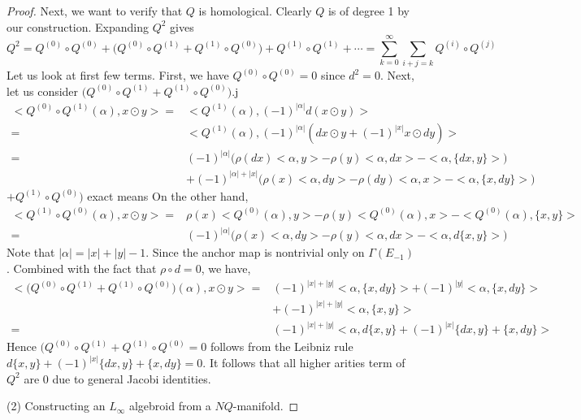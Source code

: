 \documentclass[12pt]{amsart}
\theoremstyle{definition}
\theoremstyle{remark}
\numberwithin{equation}{section}
\newcommand{\1}{{\mathbb{1}}}
\begin{document}
\begin{proof}
Next, we want to verify that $Q$ is homological. Clearly $Q$ is of degree 1 by our construction. Expanding $Q^2$ gives
\begin{equation*}
Q^2=Q^{(0)}\circ Q^{(0)} + \big(Q^{(0)}\circ Q^{(1)}+Q^{(1)}\circ Q^{(0)}\big)+ Q^{{(1)}}\circ Q^{{(1)}}+\cdots=\sum_{k=0}^{\infty}\sum_{i+j=k} Q^{(i)}\circ Q^{(j)}
\end{equation*}
Let us look at first few terms. First, we have $Q^{(0)}\circ Q^{(0)}=0$ since $d^2=0$. Next, let us consider  $\big(Q^{(0)}\circ Q^{(1)}+Q^{(1)}\circ Q^{(0)}\big)$.j
\begin{align*}
<Q^{(0)}\circ Q^{(1)}(\alpha), x\odot y>=& <Q^{(1)}(\alpha), (-1)^{|\alpha|}d(x\odot y)>\\
=&<Q^{(1)}(\alpha), (-1)^{|\alpha|}(dx\odot y+(-1)^{|x|}x\odot dy)>\\
=&(-1)^{|\alpha|}\Big(\rho(dx)<\alpha, y>- \rho(y)<\alpha, dx>-<\alpha, \{ dx, y\}>\Big)\\
&+(-1)^{|\alpha|+|x|}\Big(\rho(x)<\alpha, dy>- \rho(dy)<\alpha, x>-<\alpha, \{ x, dy\}>\Big)
\end{align*} $+Q^{(1)}\circ Q^{(0)}\big)$ exact means
On the other hand,
\begin{align*}
<Q^{(1)}\circ Q^{(0)}(\alpha), x\odot y>=&\rho(x)<Q^{(0)}(\alpha), y>- \rho(y)<Q^{(0)}(\alpha), x>-<Q^{(0)}(\alpha), \{ x, y\}>\\
=&(-1)^{|\alpha|}\Big(\rho(x)<\alpha, dy>- \rho(y)<\alpha, dx>-<\alpha, d\{ x, y\}>\Big)
\end{align*}
Note that $|\alpha|=|x|+|y|-1$. Since the anchor map is nontrivial only on $\Gamma(E_{-1})$. Combined with the fact that $\rho\circ d=0$, we have, 
\begin{align*}
<\big(Q^{(0)}\circ Q^{(1)}+Q^{(1)}\circ Q^{(0)}\big)(\alpha), x\odot y>=&(-1)^{|x|+|y|}<\alpha, \{x,dy\}>+(-1)^{|y|}<\alpha, \{x,dy\}>\\
&+(-1)^{|x|+|y|}<\alpha, \{x,y\}>\\
=&(-1)^{|x|+|y|}<\alpha, d\{x,y\}+(-1)^{|x|}\{dx,y \}+ \{x,dy\}>
\end{align*}
Hence $(Q^{(0)}\circ Q^{(1)}+Q^{(1)}\circ Q^{(0)}=0$ follows from the Leibniz rule $d\{x,y\}+(-1)^{|x|}\{dx,y \}+ \{x,dy\}=0$. It follows that all higher arities term of $Q^2$ are 0 due to general Jacobi identities.

(2) Constructing an $L_{\infty}$ algebroid from a $NQ$-manifold.


\end{proof}
\end{document}
